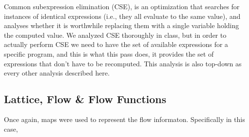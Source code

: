 Common subexpression elimination (CSE), is an optimization that searches for instances of identical expressions (i.e., they all evaluate to the same value), and analyses whether it is worthwhile replacing them with a single variable holding the computed value. We analyzed CSE thoroughly in class, but in order to actually perform CSE we need to have the set of available expressions for a specific program, and this is what this pass does, it provides the set of expressions that don't have to be recomputed. This analysis is also top-down as every other analysis described here.


\subsection*{Lattice, Flow \& Flow Functions}

Once again, maps were used to represent the flow informaton. Specifically in this case, 